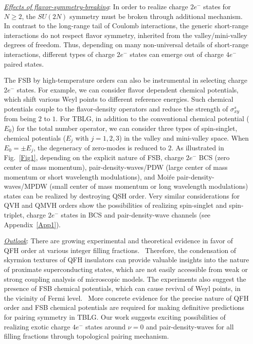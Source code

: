 \documentclass[aps,prb,amsmath,amssymb,floatfix,twocolumn]{revtex4}
\begin{document}
\underline{\emph{Effects of flavor-symmetry-breaking}}: In order to realize charge $2e^-$ states for $N \geq 2$, the $SU(2N)$ symmetry must be broken through additional mechanism. In contrast to the long-range tail of Coulomb interactions, the generic short-range interactions do not respect flavor symmetry, inherited from the valley/mini-valley degrees of freedom. Thus, depending on many non-universal details of short-range interactions, different types of charge $2e^-$ states can emerge out of charge $4e^-$ paired states.  

The FSB by high-temperature orders can also be instrumental in selecting charge $2e^-$ states. For example, we can consider flavor dependent chemical potentials, which shift various Weyl points to different reference energies. Such chemical potentials couple to the flavor-density operators and reduce the strength of $\sigma^s_{xy}$ from being $2$ to $1$. For TBLG, in addition to the conventional chemical potential ($E_0$) for the total number operator, we can consider three types of spin-singlet, chemical potentials ($E_j$ with $j=1,2,3$) in the valley and mini-valley space. When $E_0 = \pm E_j$, the degeneracy of zero-modes is reduced to $2$. As illustrated in Fig.~\ref{Fig1}, depending on the explicit nature of FSB, charge $2e^-$ BCS (zero center of mass momentum), pair-density-waves/PDW (large center of mass momentum or short wavelength modulations), and Moi\'re pair-density-waves/MPDW (small center of mass momentum or long wavelength modulations) states can be realized by destroying QSH order. Very similar considerations for QVH and QMVH orders show the possibilities of realizing spin-singlet and spin-triplet, charge $2e^-$ states in BCS and pair-density-wave channels (see Appendix~\ref{App1}). 


\underline{\emph{Outlook}}: There are growing experimental and theoretical evidence in favor of QFH order at various integer filling fractions.~\cite{Cao1,Taniguchi,Efetov1,Efetov2,Saito,Kerelsky,Choi,Jiang,Xie,Wong,Zondiner,LiuWang,Cao2,ZhangPo,KangVafek1,KangVafek3,Liao}  Therefore, the condensation of skyrmion textures of QFH insulators can provide valuable insights into the nature of proximate superconducting states, which are not easily accessible from weak or strong coupling analysis of microscopic models. The experiments also suggest the presence of FSB chemical potentials, which can cause revival of Weyl points, in the vicinity of Fermi level.~\cite{Wong,Zondiner} More concrete evidence for the precise nature of QFH order and FSB chemical potentials are required for making definitive predictions for pairing symmetry in TBLG. Our work suggests exciting possibilities of realizing exotic charge $4e^-$ states around $\nu=0$ and pair-density-waves for all filling fractions through topological pairing mechanism.
\end{document}

